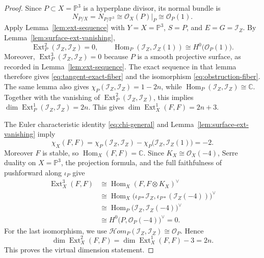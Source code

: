 \documentclass[10pt,a4paper]{amsart}
\newcommand{\C}{\mathbb{C}}
\newcommand{\Ext}{\operatorname{Ext}}
\newcommand{\Hom}{\operatorname{Hom}}
\newcommand{\I}{\mathcal{I}}
\newcommand{\OO}{\mathcal{O}}
\newcommand{\PP}{\mathbb{P}}
\newcommand{\dual}{\vee}
\theoremstyle{plain}
\theoremstyle{definition}
\theoremstyle{remark}
\begin{document}
\begin{proof}
Since $P\subset X=\PP^3$ is a hyperplane divisor, its normal bundle is
\[
N_{P/X}=N_{P/\PP^3}\cong \OO_X(P)|_P\cong\OO_P(1).
\]
Apply Lemma~\ref{lem:ext-sequence} with $Y=X=\PP^3$, $S=P$, and $E=G=\I_Z$.
By Lemma~\ref{lem:surface-ext-vanishing},
\[
\Ext^2_P(\I_Z,\I_Z)=0,
\qquad
\Hom_P(\I_Z,\I_Z(1))\cong H^0\bigl(\OO_P(1)\bigr).
\]
Moreover, $\Ext^3_P(\I_Z,\I_Z)=0$ because $P$ is a smooth projective surface, as recorded in Lemma~\ref{lem:ext-sequence}.
The exact sequence in that lemma therefore gives \eqref{eq:tangent-exact-fiber} and the isomorphism \eqref{eq:obstruction-fiber}.
The same lemma also gives $\chi_P(\I_Z,\I_Z)=1-2n$, while $\Hom_P(\I_Z,\I_Z)\cong\C$.
Together with the vanishing of $\Ext^2_P(\I_Z,\I_Z)$, this implies $\dim\Ext^1_P(\I_Z,\I_Z)=2n$.
This gives $\dim\Ext^1_X(F,F)=2n+3$.

The Euler characteristic identity \eqref{eq:chi-general} and Lemma~\ref{lem:surface-ext-vanishing} imply
\[
\chi_X(F,F)=\chi_P(\I_Z,\I_Z)-\chi_P\bigl(\I_Z,\I_Z(1)\bigr)=-2.
\]
Moreover $F$ is stable, so $\Hom_X(F,F)=\C$.
Since $K_X\cong\OO_X(-4)$, Serre duality on $X=\PP^3$, the projection formula, and the full faithfulness of pushforward along $\iota_P$ give
\[
\begin{aligned}
\Ext^3_X(F,F)
&\cong \Hom_X(F,F\otimes K_X)^\dual \\
&\cong \Hom_X\bigl(\iota_{P*}\I_Z,\iota_{P*}(\I_Z(-4))\bigr)^\dual \\
&\cong \Hom_P\bigl(\I_Z,\I_Z(-4)\bigr)^\dual \\
&\cong H^0\bigl(P,\OO_P(-4)\bigr)^\dual=0.
\end{aligned}
\]
For the last isomorphism, we use $\mathcal Hom_P(\I_Z,\I_Z)\cong\OO_P$.
Hence
\[
\dim \Ext^2_X(F,F)=\dim\Ext^1_X(F,F)-3=2n.
\]
This proves the virtual dimension statement.
\end{proof}
\end{document}
